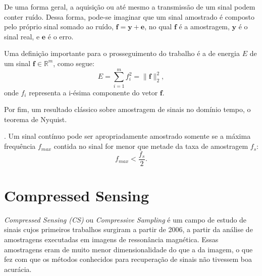\documentclass[cic,tc]{iiufrgs}
\renewcommand{\vec}[1]{\bm{#1}}
\begin{document}
De uma forma geral, a aquisição ou até mesmo a transmissão de um sinal podem conter ruído.
Dessa forma, pode-se imaginar que um sinal amostrado é composto pelo próprio sinal somado ao ruído,
$\vec{f} = \vec{y} + \vec{e}$, no qual $\vec{f}$ é a amostragem, $\vec{y}$ é o sinal real, 
e $\vec{e}$ é o erro.

Uma definição importante para o prosseguimento do trabalho é a de energia $E$ de um sinal $\vec{f} \in \mathbb{R}^m$, como segue:
\begin{equation}
    E = \sum_{i=1}^m f_i^2 = \lVert \vec{f} \rVert_2^2,
\end{equation}
onde $f_i$ representa a i-ésima componente do vetor $\vec{f}$.

Por fim, um resultado clássico sobre amostragem de sinais no domínio tempo, o teorema de Nyquist.
\begin{teorema}
    \cite{NyquistSampling}.
    Um sinal contínuo pode ser apropriadamente amostrado somente se a máxima frequência $f_{max}$ contida 
    no sinal for menor que metade da taxa de amostragem $f_s$:
    \begin{equation*}
        f_{max} < \frac{f_s}{2}.
    \end{equation*}
    \label{teo:nyquist}
\end{teorema}


\section{Compressed Sensing}
\textit{Compressed Sensing (CS)} ou \textit{Compressive Sampling} é um campo de estudo de sinais cujos
primeiros trabalhos surgiram a partir de 2006, a partir da análise de amostragens executadas em imagens de 
ressonância magnética. 
Essas amostragens eram de muito menor dimensionalidade do que a da imagem, o que 
fez com que os métodos conhecidos para recuperação de sinais não tivessem boa acurácia.
\end{document}
